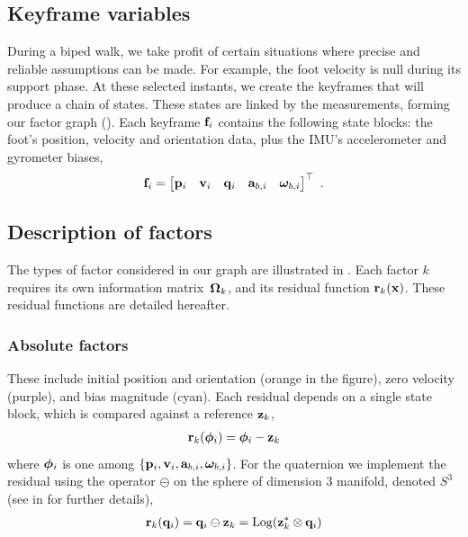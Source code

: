 
\subsection{Keyframe variables}

During a biped walk, we take profit of certain situations where precise and reliable assumptions can be made. For example, the  foot velocity is null during its support phase. At these selected instants, we create the keyframes that will produce a chain of states. These states are linked by the measurements, forming our factor graph (). Each keyframe ${\bf f}_i$ contains the following state blocks: the foot's position, velocity and orientation data, plus the IMU's accelerometer and gyrometer biases,
%
\begin{align}
{\bf f}_i = \begin{bmatrix}
{\bf p}_i & {\bf v}_i & {\bf q}_i & {\bf a}_{b,i} & {{\bm \omega}}_{b,i}
\end{bmatrix}^{\top}
~.
\end{align}
%


\subsection{Description of factors}

The types of factor considered in our graph are illustrated in . 
Each factor $k$ requires its own information matrix~${\bm \Omega}_k$, and its residual function ${\bf r}_k({\bf x})$. These residual functions are detailed hereafter.

\subsubsection{Absolute factors}

These include initial position and orientation (orange in the figure), zero velocity (purple), and bias magnitude (cyan). Each residual depends on a single state block, which is compared against a reference ${\bf z}_k$,
%
\begin{align}
{\bf r}_k({\bm \phi}_i) = {\bm \phi}_i - {\bf z}_k
\end{align}
%
where ${\bm \phi}_i$ is one among $\{{\bf p}_i,{\bf v}_i,{\bf a}_{b,i},{{\bm \omega}}_{b,i}\}$. 
For the quaternion we implement the residual using the operator $\ominus$ on the sphere of dimension $3$ manifold, denoted $S^3$ (see  in  for further details),
%
\begin{align}
{\bf r}_k({\bf q}_i) = {\bf q}_i\ominus{\bf z}_k = \operatorname*{Log}({\bf z}_k^*\otimes{\bf q}_i)
\end{align}
%

